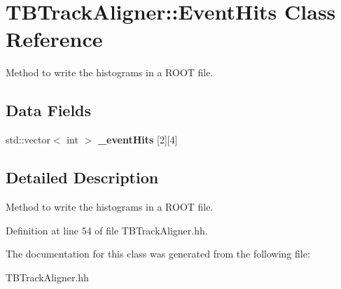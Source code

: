 \section{TBTrackAligner::EventHits Class Reference}
\label{classTBTrackAligner_1_1EventHits}


Method to write the histograms in a ROOT file.  
\subsection*{Data Fields}
\begin{DoxyCompactItemize}
\item 
std::vector$<$ int $>$ {\bfseries \_\-eventHits} [2][4]\label{classTBTrackAligner_1_1EventHits_afb7cf3fe9d066546baa05ea1980bf4a6}

\end{DoxyCompactItemize}


\subsection{Detailed Description}
Method to write the histograms in a ROOT file. 

Definition at line 54 of file TBTrackAligner.hh.

The documentation for this class was generated from the following file:\begin{DoxyCompactItemize}
\item 
TBTrackAligner.hh\end{DoxyCompactItemize}
